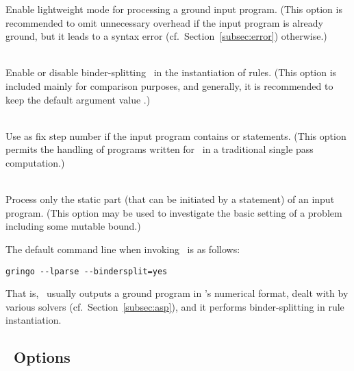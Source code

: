 \begin{description}
Enable lightweight mode for processing a ground input program.
(This option is recommended to 
 omit unnecessary overhead if the input program is already ground,
 but it leads to a syntax error (cf.\ Section~\ref{subsec:error}) otherwise.)
\item[\code{--bindersplit yes|no}]~\\
Enable or disable binder-splitting~\cite{gescth07a} in the instantiation of rules.
(This option is included mainly for comparison purposes, and generally,
 it is recommended to keep the default argument value .)
\item[\code{--ifixed \textit{n}}]~\\
Use  as fix step number if the input program
contains  or  statements.
(This option permits the handling of programs written for \iclingo\
 in a traditional single pass computation.)
\item[\code{--ibase}]~\\
Process only the static part (that can be initiated by a  statement)
of an input program.
(This option may be used to investigate the basic setting of a problem
 including some mutable bound.)
\end{description}
%
The default command line when invoking \gringo\ is as follows:
%
\begin{lstlisting}[numbers=none]
gringo --lparse --bindersplit=yes
\end{lstlisting}
That is, \gringo\ usually outputs a ground program in \lparse's numerical format,
dealt with by various solvers (cf.\ Section~\ref{subsec:asp}),
and it performs binder-splitting in rule instantiation.


\subsection{\clingo\ Options}\label{subsec:opt:clingo}

